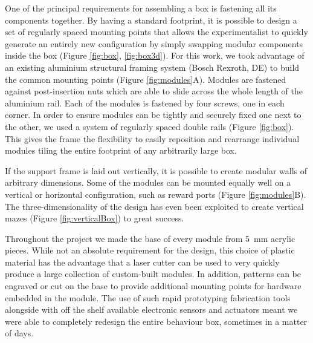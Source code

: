One of the principal requirements for assembling a box is fastening all its components together. By having a standard footprint, it is possible to design a set of regularly spaced mounting points that allows the experimentalist to quickly generate an entirely new configuration by simply swapping modular components inside the box (Figure \ref{fig:box}, \ref{fig:box3d}). For this work, we took advantage of an existing aluminium structural framing system (Bosch Rexroth, DE) to build the common mounting points (Figure \ref{fig:modules}A). Modules are fastened against post-insertion nuts which are able to slide across the whole length of the aluminium rail. Each of the modules is fastened by four screws, one in each corner. In order to ensure modules can be tightly and securely fixed one next to the other, we used a system of regularly spaced double rails (Figure \ref{fig:box}). This gives the frame the flexibility to easily reposition and rearrange individual modules tiling the entire footprint of any arbitrarily large box.

If the support frame is laid out vertically, it is possible to create modular walls of arbitrary dimensions. Some of the modules can be mounted equally well on a vertical or horizontal configuration, such as reward ports (Figure \ref{fig:modules}B). The three-dimensionality of the design has even been exploited to create vertical mazes (Figure \ref{fig:verticalBox}) to great success.

Throughout the project we made the base of every module from \SI{5}{\milli\meter} acrylic pieces. While not an absolute requirement for the design, this choice of plastic material has the advantage that a laser cutter can be used to very quickly produce a large collection of custom-built modules. In addition, patterns can be engraved or cut on the base to provide additional mounting points for hardware embedded in the module. The use of such rapid prototyping fabrication tools alongside with off the shelf available electronic sensors and actuators meant we were able to completely redesign the entire behaviour box, sometimes in a matter of days.
